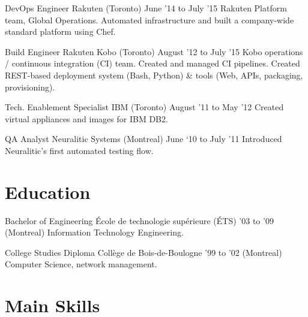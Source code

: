 \documentclass[]{cvpn}
\begin{document}
\begin{multicols}{2}
\begin{eventlist}
\item{DevOps Engineer}
     {Rakuten (Toronto)}
     {June '14 to July '15}
{
Rakuten Platform team, Global Operations.
Automated infrastructure and built a company-wide
standard platform using Chef.
}

\eventlink{}

\item{Build Engineer}
     {Rakuten Kobo (Toronto)}
     {August '12 to July '15}
{
Kobo operations / continuous integration (CI) team.
Created and managed CI pipelines.
Created REST-based deployment system (Bash, Python) \&
tools (Web, APIs, packaging, provisioning).
}

\item{Tech. Enablement Specialist}
     {IBM (Toronto)}
     {August '11 to May '12}
{
Created virtual appliances and images for IBM DB2.
}

\item{QA Analyst}
     {Neuralitic Systems (Montreal)}
     {June ‘10 to July ’11}
{
Introduced Neuralitic's first automated testing flow.
}

\end{eventlist}

\section{Education}
\begin{eventlist}

\item{Bachelor of Engineering}
     {École de technologie supérieure (ÉTS)}
     {'03 to '09}
{
(Montreal) Information Technology Engineering.
}

\item{College Studies Diploma}
     {Collège de Bois-de-Boulogne}
     {'99 to '02}
{
(Montreal) Computer Science, network management.
}

\end{eventlist}

\section{Main Skills}
\begin{skillslist}



\end{skillslist}
\end{multicols}
\end{document}
